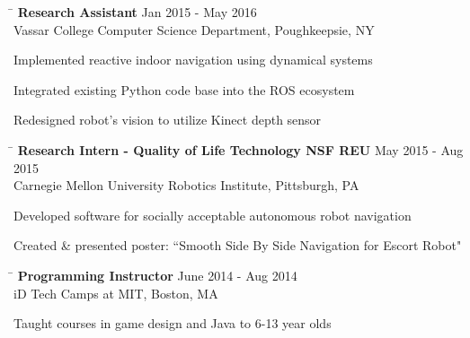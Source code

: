 \documentclass{res}
\begin{document}
\begin{resume}
{    \vspace{-12pt}
    \begin{tabbing}
      \hspace{5.65in}\=  \kill %
      {\bf Research Assistant}
      \>Jan 2015 - May 2016\\
      Vassar College Computer Science Department, Poughkeepsie, NY\\     
    \end{tabbing}
    \vspace{-24pt}      %
    \begin{list}{\bf{-}}{}
      \setlength{\itemsep}{-2pt}
      \item Implemented reactive indoor navigation using dynamical systems
      \item Integrated existing Python code base into the ROS ecosystem
      \item Redesigned robot's vision to utilize Kinect depth sensor
    \end{list}

    \vspace{-12pt}
    \begin{tabbing}
      \hspace{5.65in}\=  \kill %
      {\bf Research Intern - Quality of Life Technology NSF REU}
      \>May 2015 - Aug 2015\\
      Carnegie Mellon University Robotics Institute, Pittsburgh, PA\\     
    \end{tabbing}
    \vspace{-24pt}      %
    \begin{list}{\bf{-}}{}
      \setlength{\itemsep}{-2pt}
      \item Developed software for socially acceptable autonomous robot navigation
      \item Created \& presented poster: ``Smooth Side By Side Navigation for
            Escort Robot"
    \end{list}

    \vspace{-12pt}
    \begin{tabbing}
      \hspace{5.65in}\=  \kill %
      {\bf Programming Instructor}
      \>June 2014 - Aug 2014\\
      iD Tech Camps at MIT, Boston, MA\\     
    \end{tabbing}
    \vspace{-24pt}      %
    \begin{list}{\bf{-}}{}
      \setlength{\itemsep}{-2pt}
      \item Taught courses in game design and Java to 6-13 year olds
    \end{list}
  
}
\end{resume}
\end{document}

